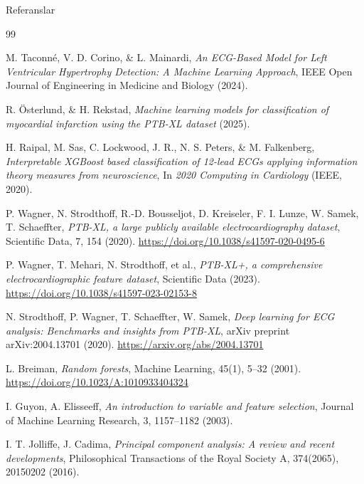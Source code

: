 \documentclass[aspectratio=169]{beamer}
\begin{document}
\begin{frame}[allowframebreaks]{Referanslar}
	\scriptsize
	\setlength{\parskip}{2pt}

	\begin{thebibliography}{99}

		M. Taconné, V. D. Corino, \& L. Mainardi,
		\emph{An ECG-Based Model for Left Ventricular Hypertrophy Detection: A Machine Learning Approach},
		IEEE Open Journal of Engineering in Medicine and Biology (2024).

		R. Österlund, \& H. Rekstad,
		\emph{Machine learning models for classification of myocardial infarction using the PTB-XL dataset} (2025).

		H. Raipal, M. Sas, C. Lockwood, J. R., N. S. Peters, \& M. Falkenberg,
		\emph{Interpretable XGBoost based classification of 12-lead ECGs applying information theory measures from neuroscience},
		In \emph{2020 Computing in Cardiology} (IEEE, 2020).

		P. Wagner, N. Strodthoff, R.-D. Bousseljot, D. Kreiseler, F. I. Lunze, W. Samek, T. Schaeffter,
		\emph{PTB-XL, a large publicly available electrocardiography dataset},
		Scientific Data, 7, 154 (2020).
		\url{https://doi.org/10.1038/s41597-020-0495-6}

		P. Wagner, T. Mehari, N. Strodthoff, et al.,
		\emph{PTB-XL+, a comprehensive electrocardiographic feature dataset},
		Scientific Data (2023).
		\url{https://doi.org/10.1038/s41597-023-02153-8}

		N. Strodthoff, P. Wagner, T. Schaeffter, W. Samek,
		\emph{Deep learning for ECG analysis: Benchmarks and insights from PTB-XL},
		arXiv preprint arXiv:2004.13701 (2020).
		\url{https://arxiv.org/abs/2004.13701}

		L. Breiman,
		\emph{Random forests},
		Machine Learning, 45(1), 5--32 (2001).
		\url{https://doi.org/10.1023/A:1010933404324}

		I. Guyon, A. Elisseeff,
		\emph{An introduction to variable and feature selection},
		Journal of Machine Learning Research, 3, 1157--1182 (2003).

		I. T. Jolliffe, J. Cadima,
		\emph{Principal component analysis: A review and recent developments},
		Philosophical Transactions of the Royal Society A, 374(2065), 20150202 (2016).


\end{thebibliography}
\end{frame}
\end{document}
